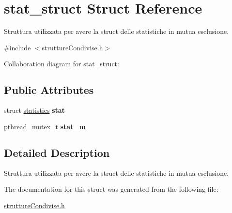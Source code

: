 \hypertarget{structstat__struct}{}\section{stat\+\_\+struct Struct Reference}
\label{structstat__struct}


Struttura utilizzata per avere la struct delle statistiche in mutua esclusione.  




{\ttfamily \#include $<$strutture\+Condivise.\+h$>$}



Collaboration diagram for stat\+\_\+struct\+:
\subsection*{Public Attributes}
\begin{DoxyCompactItemize}
\item 
\mbox{\label{structstat__struct_a87d3ef07a1443448e48f3a44dd5c3d49}} 
struct \hyperlink{structstatistics}{statistics} {\bfseries stat}
\item 
\mbox{\label{structstat__struct_afb6de8865d97325927cc9b180282aaad}} 
pthread\+\_\+mutex\+\_\+t {\bfseries stat\+\_\+m}
\end{DoxyCompactItemize}


\subsection{Detailed Description}
Struttura utilizzata per avere la struct delle statistiche in mutua esclusione. 

The documentation for this struct was generated from the following file\+:\begin{DoxyCompactItemize}
\item 
\hyperlink{struttureCondivise_8h}{strutture\+Condivise.\+h}\end{DoxyCompactItemize}
